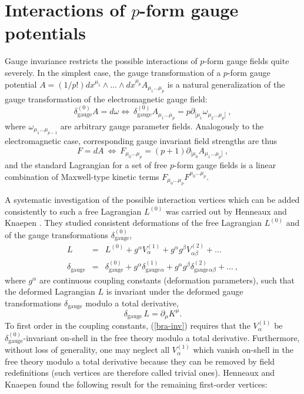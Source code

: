 \documentclass[a4paper,12pt]{article}
\begin{document}
\section{Interactions of $p$-form gauge potentials}\label{bra-sec2}

Gauge invariance restricts the possible interactions
of $p$-form gauge fields quite severely. In the simplest case,
the gauge transformation of 
a $p$-form gauge potential $A=(1/p!)
dx^{\mu_1}\wedge\dots\wedge dx^{\mu_p}A_{\mu_1\dots\mu_p}$ is a natural
generalization of the gauge transformation of the 
electromagnetic gauge field:
\begin{equation}
\delta_\mathrm{gauge}^{(0)}A=d\omega\Leftrightarrow\
\delta_\mathrm{gauge}^{(0)}A_{\mu_1\dots\mu_p}=
p\partial _{[\mu_1}\omega_{\mu_2\dots\mu_p]}\ ,
\end{equation}
where $\omega_{\mu_1\dots\mu_{p-1}}$ are arbitrary gauge
parameter fields. Analogously to
the electromagnetic case, corresponding  gauge invariant
field strengths are thus
\begin{equation}
F=dA\ \Leftrightarrow\ F_{\mu_0\dots\mu_p}=(p+1)
\partial _{[\mu_0}A_{\mu_1\dots\mu_p]}\ ,
\end{equation}
and the standard
Lagrangian for a set of free $p$-form gauge fields
is a linear combination of Maxwell-type kinetic terms
$F_{\mu_0\dots\mu_p}F^{\mu_0\dots\mu_p}$.

A systematic investigation of
the possible interaction vertices
which can be added consistently to such a free Lagrangian
$L^{(0)}$ was carried out
by Henneaux and Knaepen \cite{bra-HK1,bra-HK2,bra-HK3}. 
They studied consistent deformations of the free
Lagrangian $L^{(0)}$ and of the gauge transformations
$\delta_\mathrm{gauge}^{(0)}$,
\begin{eqnarray}
L&=& L^{(0)}+g^\alpha V^{(1)}_\alpha+g^\alpha g^\beta
V^{(2)}_{\alpha\beta}+\dots
\\
\delta_\mathrm{gauge}&=&\delta_\mathrm{gauge}^{(0)}
+g^\alpha\delta_\mathrm{gauge}^{(1)}{}_\alpha
+g^\alpha g^\beta\delta_\mathrm{gauge}^{(2)}{}_{\alpha\beta}+\dots\ ,
\end{eqnarray}
where $g^\alpha$ are continuous coupling constants (deformation parameters),
such that the deformed Lagrangian $L$ is invariant under
the deformed gauge transformations $\delta_\mathrm{gauge}$ 
modulo a total derivative,
\begin{equation}
\delta_\mathrm{gauge}\, L=\partial _\mu K^\mu.
\label{bra-inv}
\end{equation}
To first order in the coupling constants, (\ref{bra-inv}) requires
that the
$V^{(1)}_\alpha$ be $\delta_\mathrm{gauge}^{(0)}$-invariant 
on-shell in the free theory 
modulo a total derivative. Furthermore, without loss of generality,
one may neglect all $V^{(1)}_\alpha$ which
vanish on-shell in the free theory 
modulo a total derivative because they can be removed by field 
redefinitions (such vertices are therefore called
trivial ones). Henneaux and Knaepen found the following result for 
the remaining first-order vertices:
\end{document}
